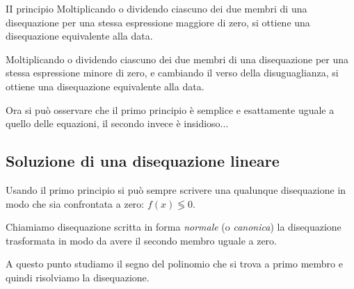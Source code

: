 \begin{teorema}{II principio}{}
Moltiplicando o dividendo ciascuno dei due membri di
una disequazione per una stessa espressione maggiore di zero, 
si ottiene una disequazione equivalente alla data.

Moltiplicando o dividendo ciascuno dei due membri di
una disequazione per una stessa espressione minore di zero, 
e cambiando il verso della disuguaglianza,
si ottiene una disequazione equivalente alla data.
\end{teorema}

Ora si può osservare che il primo principio è semplice e esattamente uguale a 
quello delle equazioni, il secondo invece è insidioso... 

\subsection{Soluzione di una disequazione lineare}

Usando il primo principio si può sempre scrivere una qualunque disequazione 
in modo che sia confrontata a zero: \(f(x) \lessgtr 0\). 

Chiamiamo disequazione scritta in forma \emph{normale} (o \emph{canonica})
la disequazione trasformata in modo da avere il secondo membro uguale a zero.

A questo punto studiamo il segno del polinomio che si trova a primo 
membro e quindi risolviamo la disequazione.

